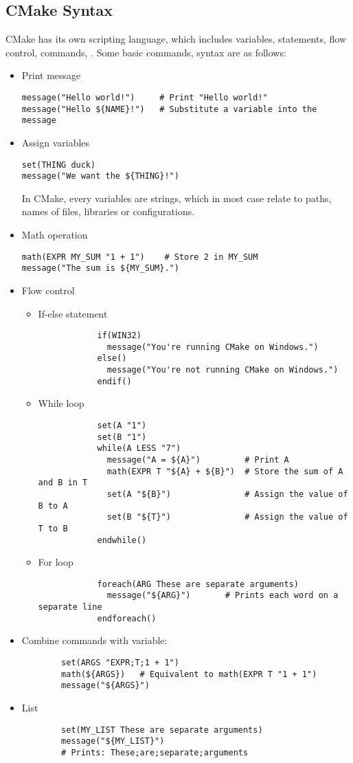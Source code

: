 \subsection{CMake Syntax}
CMake has its own scripting language, which includes variables, statements, flow control, commands, \etc. Some basic commands, syntax are as follows:
\begin{itemize}
	\setlength\itemsep{0em}
	\item Print message
	
	\verb|message("Hello world!")     # Print "Hello world!"|\\
	\verb|message("Hello ${NAME}!")   # Substitute a variable into the message|
	\item Assign variables
	
	\texttt{set(THING duck)}\\
	\verb|message("We want the ${THING}!")|
		
	In CMake, every variables are strings, which in most case relate to paths, names of files, libraries or configurations.
	\item Math operation
	
	\verb|math(EXPR MY_SUM "1 + 1")    # Store 2 in MY_SUM|\\
	\verb|message("The sum is ${MY_SUM}.")|	
	\item Flow control
	\begin{itemize}
		\item If-else statement
		\begin{verbatim}
			if(WIN32)
			  message("You're running CMake on Windows.")
			else()
			  message("You're not running CMake on Windows.")
			endif()
		\end{verbatim}
		\item While loop
		\begin{verbatim}
			set(A "1")
			set(B "1")
			while(A LESS "7")
			  message("A = ${A}")         # Print A
			  math(EXPR T "${A} + ${B}")  # Store the sum of A and B in T
			  set(A "${B}")               # Assign the value of B to A
			  set(B "${T}")               # Assign the value of T to B
			endwhile()
		\end{verbatim}
		\item For loop
		\begin{verbatim}
			foreach(ARG These are separate arguments)
			  message("${ARG}")       # Prints each word on a separate line
			endforeach()
		\end{verbatim}
		
	\end{itemize}	
	\item Combine commands with variable:
	\begin{verbatim}
		set(ARGS "EXPR;T;1 + 1")
		math(${ARGS})   # Equivalent to math(EXPR T "1 + 1")
		message("${ARGS}")
	\end{verbatim}
	\item List
	\begin{verbatim}
		set(MY_LIST These are separate arguments)
		message("${MY_LIST}")
		# Prints: These;are;separate;arguments
		

\end{verbatim}
\end{itemize}
